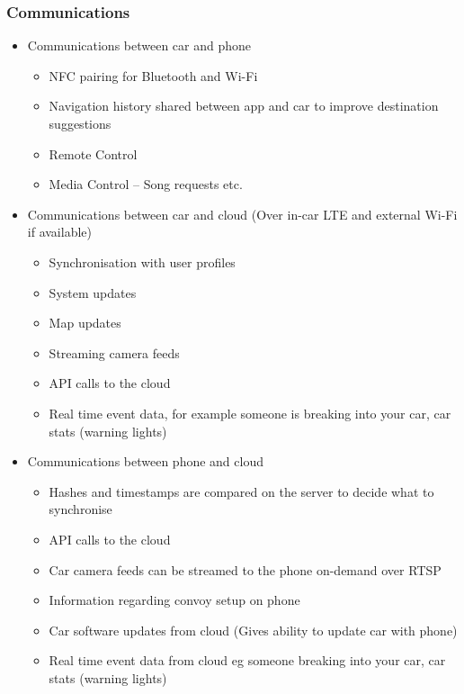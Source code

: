 \documentclass{article}
\begin{document}
\subsubsection{Communications}
  \begin{itemize}
      \item Communications between car and phone
      \begin{itemize}     
        	\item NFC pairing for Bluetooth and Wi-Fi
            \item Navigation history shared between app and car to improve destination suggestions
            \item Remote Control
            \item Media Control -- Song requests etc.
	  \end{itemize}
	  \item Communications between car and cloud (Over in-car LTE and external Wi-Fi if available)     	
        \begin{itemize}
          \item Synchronisation with user profiles
          \item System updates
          \item Map updates
          \item Streaming camera feeds
          \item API calls to the cloud
          \item Real time event data, for example someone is breaking into your car, car stats (warning lights)
        \end{itemize}
      \item Communications between phone and cloud      
        \begin{itemize}
        	\item Hashes and timestamps are compared on the server to decide what to synchronise
            \item API calls to the cloud
            \item Car camera feeds can be streamed to the phone on-demand over RTSP
            \item Information regarding convoy setup on phone
            \item Car software updates from cloud (Gives ability to update car with phone)
            \item Real time event data from cloud eg someone breaking into your car, car stats (warning lights)
        \end{itemize}

\end{itemize}
\end{document}

